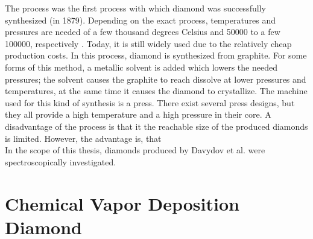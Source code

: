 	The \HPHT process was the first process with which diamond was successfully synthesized (in 1879).
	Depending on the exact process, temperatures and pressures are needed of a few thousand degrees Celsius and  \num{50000} to a few \num{100000}, respectively \cite{davis1993diamond}.
	Today, it is still widely used due to the relatively cheap production costs\cite{wikiSyntheticDiamond}.
	In this process, diamond is synthesized from graphite.
	For some forms of this method, a metallic solvent is added which lowers the needed pressures; the solvent causes the graphite to reach dissolve at lower pressures and temperatures, at the same time it causes the diamond to crystallize.
	The machine used for this kind of synthesis is a press.
	There exist several press designs, but they all provide a high temperature and a high pressure in their core.
	A disadvantage of the \HPHT process is that it the reachable size of the produced diamonds is limited.
	However, the advantage is, that 
	\\
	In the scope of this thesis, \HPHT diamonds produced by Davydov et al. \cite{Davydov2014} were spectroscopically investigated.


\section[CVD]{Chemical Vapor Deposition Diamond}\label{sec::cvd}

	\begin{figure}[tp]
		\begin{subfigure}[t]{ 0.49\linewidth}
			\caption{}\label{subfig::cvd_large}
			\centering
		\end{subfigure}
		\hfill
		\begin{subfigure}[t]{ 0.49\linewidth}
			\caption{}\label{subfig::cvd_detail}
			\centering
		\end{subfigure}
		\caption{}
		\label{fig::sem_cvd}
	\end{figure}

